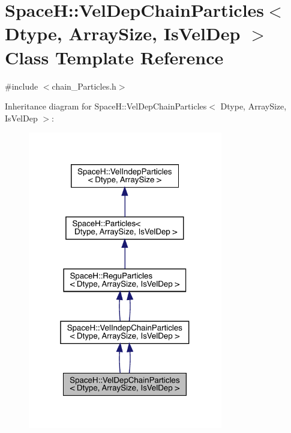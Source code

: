 \hypertarget{class_space_h_1_1_vel_dep_chain_particles}{}\section{SpaceH\+:\+:Vel\+Dep\+Chain\+Particles$<$ Dtype, Array\+Size, Is\+Vel\+Dep $>$ Class Template Reference}
\label{class_space_h_1_1_vel_dep_chain_particles}


{\ttfamily \#include $<$chain_\+Particles.\+h$>$}



Inheritance diagram for SpaceH\+:\+:Vel\+Dep\+Chain\+Particles$<$ Dtype, Array\+Size, Is\+Vel\+Dep $>$\+:
\nopagebreak
\begin{figure}[H]
\begin{center}
\leavevmode
\includegraphics[width=241pt]{class_space_h_1_1_vel_dep_chain_particles__inherit__graph}
\end{center}
\end{figure}


